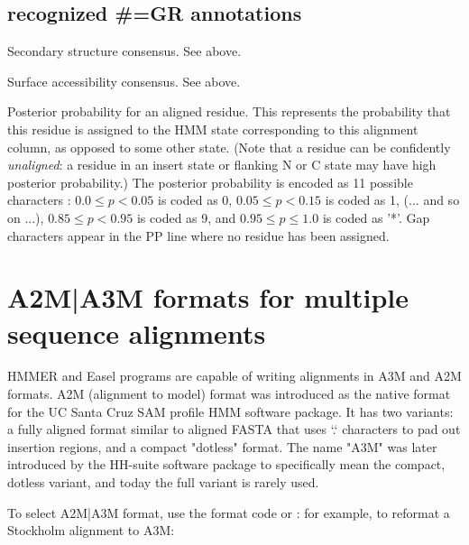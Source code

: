 \subsection{recognized \#=GR annotations}
\begin{sreitems}{}
\item [\monob{SS}]
        Secondary structure consensus. See  above.
\item [\monob{SA}]
        Surface accessibility consensus. See  above.
\item [\monob{PP}] Posterior probability for an aligned residue. This
  represents the probability that this residue is assigned to the HMM
  state corresponding to this alignment column, as opposed to some
  other state. (Note that a residue can be confidently
  \emph{unaligned}: a residue in an insert state or flanking N or C
  state may have high posterior probability.) The posterior
  probability is encoded as 11 possible characters : $0.0
  \leq p < 0.05$ is coded as 0, $0.05 \leq p < 0.15$ is coded as 1,
  (... and so on ...), $0.85 \leq p < 0.95$ is coded as 9, and $0.95
  \leq p \leq 1.0$ is coded as '*'. Gap characters appear in the PP
  line where no residue has been assigned.
\end{sreitems}



\newpage
\section{A2M|A3M formats for multiple sequence alignments}


HMMER and Easel programs are capable of writing alignments in A3M and
A2M formats. A2M (alignment to model) format was introduced as the
native format for the UC Santa Cruz SAM profile HMM software
package. It has two variants: a fully aligned format similar to
aligned FASTA that uses `.` characters to pad out insertion regions,
and a compact "dotless" format. The name "A3M" was later introduced by
the HH-suite software package to specifically mean the compact,
dotless variant, and today the full variant is rarely used.

To select A2M|A3M format, use the format code  or
: for example, to reformat a Stockholm alignment to A3M:

